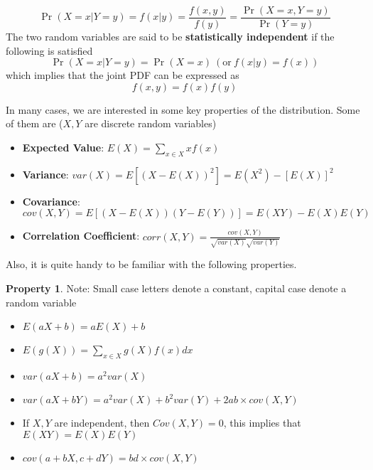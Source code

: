 \documentclass[12pt]{article}
\theoremstyle{definition}
\theoremstyle{property}
\newtheorem{property}{Property}[section]
\theoremstyle{assumption}
\theoremstyle{example}
\theoremstyle{comment}
\begin{document}
\[
\Pr(X=x|Y=y)=f(x|y)=\frac{f(x,y)}{f(y)}=\frac{\Pr(X=x, Y=y)}{\Pr(Y=y)}
\] 
The two random variables are said to be \textbf{statistically independent} if the following is satisfied
\[
\Pr(X=x|Y=y)=\Pr(X=x)\ (\text{or}\ f(x|y)=f(x))
\]
which implies that the joint PDF can be expressed as
\[
f(x,y)=f(x)f(y)
\] \par\medskip
In many cases, we are interested in some key properties of the distribution. Some of them are ($X,Y$ are discrete random variables) \\
\begin{itemize}
\item \textbf{Expected Value}: $E(X)=\sum_{x\in X} xf(x)$
\item \textbf{Variance}: $var(X)=E[(X-E(X))^2]=E(X^2)-[E(X)]^2$
\item \textbf{Covariance}: $cov(X,Y)=E[(X-E(X))(Y-E(Y))]=E(XY)-E(X)E(Y)$
\item \textbf{Correlation Coefficient}: $corr(X,Y)=\frac{cov(X,Y)}{\sqrt{var(X)}\sqrt{var(Y)}}$
\end{itemize}  \par\medskip\medskip
Also, it is quite handy to be familiar with the following properties.\\
\begin{mdframed}[backgroundcolor=blue!5] 
\begin{property}
Note: Small case letters denote a constant, capital case denote a random variable
\begin{itemize}
\item $E(aX+b) = aE(X)+b$
\item $E(g(X))=\sum_{x\in X}g(X)f(x)dx$
\item $var(aX+b)=a^2var(X)$
\item $var(aX+bY)=a^2var(X)+b^2var(Y)+2ab\times cov(X,Y)$
\item If $X,Y$ are independent, then $Cov(X,Y) =0$, this implies that \\$E(XY)=E(X)E(Y)$
\item $cov(a+bX, c+dY)=bd\times cov(X,Y)$ 
\end{itemize} \par\medskip
\end{property}
\end{mdframed}
\end{document}
